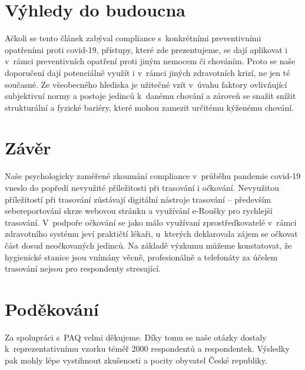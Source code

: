 \section*{Výhledy do budoucna }

Ačkoli se tento článek zabýval compliance s~konkrétními preventivními opatřeními proti covid-19, přístupy, které zde prezentujeme, se dají aplikovat i v~rámci preventivních opatření proti jiným nemocem či chováním. Proto se naše doporučení dají potenciálně využít i v~rámci jiných zdravotních krizí, ne jen té současné. Ze všeobecného hlediska je užitečné vzít v~úvahu faktory ovlivňující subjektivní normy a postoje jedinců k~danému chování a zároveň se snažit snížit strukturální a fyzické bariéry, které mohou zamezit určitému kýženému chování. 

\section*{Závěr}

Naše psychologicky zaměřené zkoumání compliance v~průběhu pandemie covid-19 vneslo do popředí nevyužité příležitosti při trasování i očkování. Nevyužitou příležitostí při trasování zůstávají digitální nástroje trasování -- především sebereportování skrze webovou stránku a využívání e-Roušky pro rychlejší trasování. V~podpoře očkování se jako málo využívaní zprostředkovatelé v~rámci zdravotního systému jeví praktičtí lékaři, u~kterých deklarovala zájem se očkovat část dosud neočkovaných jedinců. Na základě výzkumu můžeme konstatovat, že hygienické stanice jsou vnímány věcně, profesionálně a telefonáty za účelem trasování nejsou pro respondenty stresující. 

\section*{Poděkování}

Za spolupráci s~PAQ velmi děkujeme. Díky tomu se naše otázky dostaly k~reprezentativnímu vzorku téměř 2000 respondentů a respondentek. Výsledky pak mohly lépe vystihnout zkušenosti a pocity obyvatel České republiky.